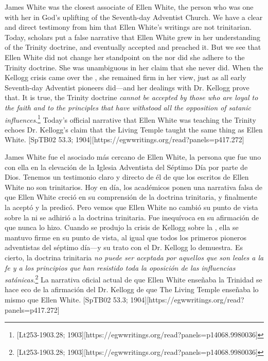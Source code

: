 James White was the closest associate of Ellen White, the person who was one with her in God’s uplifting of the Seventh-day Adventist Church. We have a clear and direct testimony from him that Ellen White’s writings are not trinitarian. Today, scholars put a false narrative that Ellen White grew in her understanding of the Trinity doctrine, and eventually accepted and preached it. But we see that Ellen White did not change her standpoint on the  nor did she adhere to the Trinity doctrine. She was unambiguous in her claim that she never did. When the Kellogg crisis came over the , she remained firm in her view, just as all early Seventh-day Adventist pioneers did—and her dealings with Dr. Kellogg prove that. It is true, the Trinity doctrine \textit{cannot be accepted by those who are loyal to the faith and to the principles that have withstood all the opposition of satanic influences}.\footnote{[Lt253-1903.28; 1903][https://egwwritings.org/read?panels=p14068.9980036]} Today’s official narrative that Ellen White was teaching the Trinity echoes Dr. Kellogg’s claim that the Living Temple taught the same thing as Ellen White. [SpTB02 53.3; 1904][https://egwwritings.org/read?panels=p417.272]


James White fue el asociado más cercano de Ellen White, la persona que fue uno con ella en la elevación de la Iglesia Adventista del Séptimo Día por parte de Dios. Tenemos un testimonio claro y directo de él de que los escritos de Ellen White no son trinitarios. Hoy en día, los académicos ponen una narrativa falsa de que Ellen White creció en su comprensión de la doctrina trinitaria, y finalmente la aceptó y la predicó. Pero vemos que Ellen White no cambió su punto de vista sobre la  ni se adhirió a la doctrina trinitaria. Fue inequívoca en su afirmación de que nunca lo hizo. Cuando se produjo la crisis de Kellogg sobre la , ella se mantuvo firme en su punto de vista, al igual que todos los primeros pioneros adventistas del séptimo día—y su trato con el Dr. Kellogg lo demuestra. Es cierto, la doctrina trinitaria \textit{no puede ser aceptada por aquellos que son leales a la fe y a los principios que han resistido toda la oposición de las influencias satánicas}.\footnote{[Lt253-1903.28; 1903][https://egwwritings.org/read?panels=p14068.9980036]} La narrativa oficial actual de que Ellen White enseñaba la Trinidad se hace eco de la afirmación del Dr. Kellogg de que The Living Temple enseñaba lo mismo que Ellen White. [SpTB02 53.3; 1904][https://egwwritings.org/read?panels=p417.272]





% 
